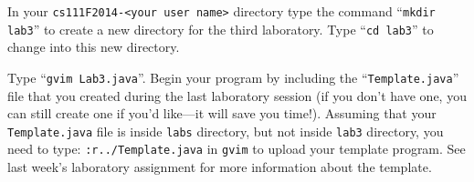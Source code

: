 In your {\tt cs111F2014-<your user name>} directory type the command ``{\tt mkdir lab3}'' to create a new directory for the third laboratory.
\noindent Type ``{\tt cd lab3}'' to change into this new directory.  

 Type ``{\tt gvim Lab3.java}''. Begin your program by including the ``{\tt Template.java}'' file
that you created during the last laboratory session (if you don't have one, you can still create one if 
you'd like---it will save you time!). Assuming that your {\tt Template.java} file is
inside {\tt labs} directory, but not inside {\tt lab3} directory, you need to type:
{\tt :r../Template.java} in {\tt gvim} to upload your template program. See last week's laboratory assignment
for more information about the template.

\vspace{-0.15in}
